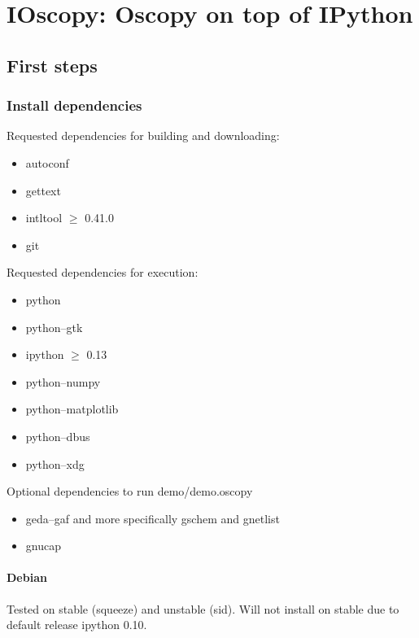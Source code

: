 \documentclass[a4paper,11pt]{report}
\begin{document}
\chapter{IOscopy: Oscopy on top of IPython}

\section{First steps}
\subsection{Install dependencies}
Requested dependencies for building and downloading:
\begin{itemize}
\item    autoconf
\item    gettext
\item    intltool $\ge$ 0.41.0
\item    git
\end{itemize}

\noindent Requested dependencies for execution:
\begin{itemize}
\item    python
\item    python--gtk
\item    ipython $\ge$ 0.13
\item    python--numpy
\item    python--matplotlib
\item    python--dbus
\item    python--xdg
\end{itemize}

\noindent Optional dependencies to run demo/demo.oscopy
\begin{itemize}
\item    geda--gaf and more specifically gschem and gnetlist
\item    gnucap
\end{itemize}

\subsubsection{Debian}
Tested on stable (squeeze) and unstable (sid). Will not install on stable due to default release ipython 0.10.
\end{document}
